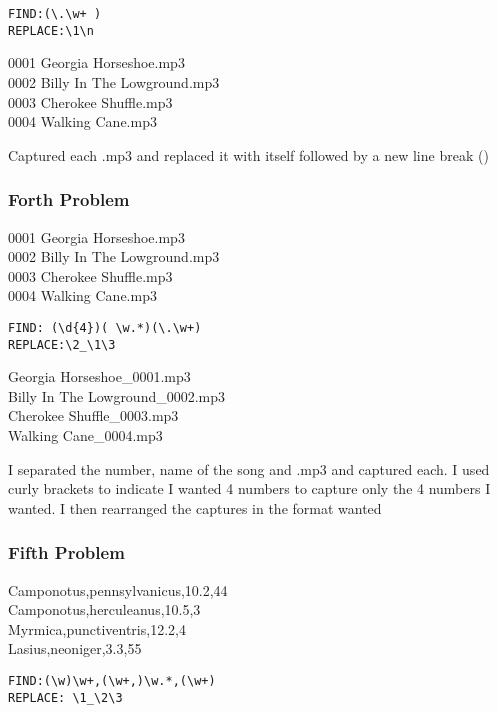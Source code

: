 \documentclass[
]{article}
\begin{document}
\begin{verbatim}
FIND:(\.\w+ )
REPLACE:\1\n
\end{verbatim}

0001 Georgia Horseshoe.mp3\\
0002 Billy In The Lowground.mp3\\
0003 Cherokee Shuffle.mp3\\
0004 Walking Cane.mp3

Captured each .mp3 and replaced it with itself followed by a new line
break (\n)

\hypertarget{forth-problem}{%
\subsubsection{Forth Problem}\label{forth-problem}}

0001 Georgia Horseshoe.mp3\\
0002 Billy In The Lowground.mp3\\
0003 Cherokee Shuffle.mp3\\
0004 Walking Cane.mp3

\begin{verbatim}
FIND: (\d{4})( \w.*)(\.\w+)
REPLACE:\2_\1\3
\end{verbatim}

Georgia Horseshoe\_0001.mp3\\
Billy In The Lowground\_0002.mp3\\
Cherokee Shuffle\_0003.mp3\\
Walking Cane\_0004.mp3

I separated the number, name of the song and .mp3 and captured each. I
used curly brackets to indicate I wanted 4 numbers to capture only the 4
numbers I wanted. I then rearranged the captures in the format wanted

\hypertarget{fifth-problem}{%
\subsubsection{Fifth Problem}\label{fifth-problem}}

Camponotus,pennsylvanicus,10.2,44\\
Camponotus,herculeanus,10.5,3\\
Myrmica,punctiventris,12.2,4\\
Lasius,neoniger,3.3,55

\begin{verbatim}
FIND:(\w)\w+,(\w+,)\w.*,(\w+)
REPLACE: \1_\2\3
\end{verbatim}
\end{document}
